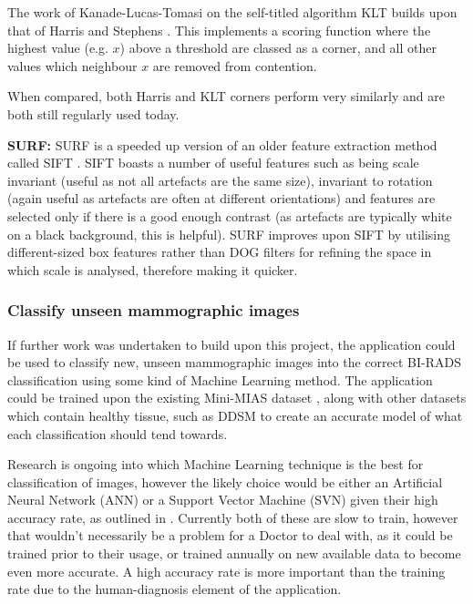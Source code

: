 The work of Kanade-Lucas-Tomasi on the self-titled algorithm \acrshort{KLT} builds upon that of Harris and Stephens \cite{Shi_Tomasi_1994} \cite{tomasi2004detection}. This implements a scoring function where the highest value (e.g. $x$) above a threshold are classed as a corner, and all other values which neighbour $x$ are removed from contention.

When compared, both Harris and KLT corners perform very similarly and are both still regularly used today.

\noindent \textbf{SURF: } \acrfull{SURF} \cite{Bay_Tuytelaars_Gool_2006} is a speeded up version of an older feature extraction method called \acrfull{SIFT} \cite{Lowe_1999}. \acrshort{SIFT} boasts a number of useful features such as being scale invariant (useful as not all artefacts are the same size), invariant to rotation (again useful as artefacts are often at different orientations) and features are selected only if there is a good enough contrast (as artefacts are typically white on a black background, this is helpful). \acrshort{SURF} improves upon \acrshort{SIFT} by utilising different-sized box features rather than \acrfull{DOG} filters for refining the space in which scale is analysed, therefore making it quicker.

\subsubsection{Classify unseen mammographic images}

If further work was undertaken to build upon this project, the application could be used to classify new, unseen mammographic images into the correct BI-RADS classification using some kind of Machine Learning method. The application could be trained upon the existing Mini-MIAS dataset \cite{Suckling_1994}, along with other datasets which contain healthy tissue, such as \acrshort{DDSM} \cite{Heath_Bowyer_Kopans_Moore_Kegelmeyer_Processing} \cite{Heath_Bowyer_Kopans_Kegelmeyer_Moore_Chang_MunishKumaran_1998} to create an accurate model of what each classification should tend towards.

Research is ongoing into which Machine Learning technique is the best for classification of images, however the likely choice would be either an Artificial Neural Network (ANN) or a Support Vector Machine (SVN) given their high accuracy rate, as outlined in \cite{kotsiantis2007supervised}. Currently both of these are slow to train, however that wouldn't necessarily be a problem for a Doctor to deal with, as it could be trained prior to their usage, or trained annually on new available data to become even more accurate. A high accuracy rate is more important than the training rate due to the human-diagnosis element of the application.

